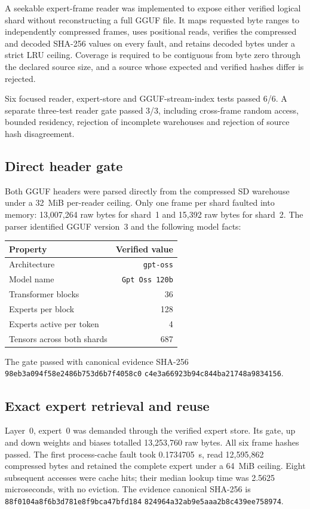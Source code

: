 A seekable expert-frame reader was implemented to expose either verified
logical shard without reconstructing a full GGUF file.  It maps requested byte
ranges to independently compressed frames, uses positional reads, verifies the
compressed and decoded SHA-256 values on every fault, and retains decoded bytes
under a strict LRU ceiling.  Coverage is required to be contiguous from byte
zero through the declared source size, and a source whose expected and verified
hashes differ is rejected.

Six focused reader, expert-store and GGUF-stream-index tests passed 6/6.  A
separate three-test reader gate passed 3/3, including cross-frame random access,
bounded residency, rejection of incomplete warehouses and rejection of source
hash disagreement.

\subsection{Direct header gate}

Both GGUF headers were parsed directly from the compressed SD warehouse under
a 32~MiB per-reader ceiling.  Only one frame per shard faulted into memory:
13,007,264 raw bytes for shard~1 and 15,392 raw bytes for shard~2.  The parser
identified GGUF version~3 and the following model facts:
\begin{center}
\begin{tabular}{lr}
\toprule
Property & Verified value \\
\midrule
Architecture & \texttt{gpt-oss} \\
Model name & \texttt{Gpt Oss 120b} \\
Transformer blocks & 36 \\
Experts per block & 128 \\
Experts active per token & 4 \\
Tensors across both shards & 687 \\
\bottomrule
\end{tabular}
\end{center}
The gate passed with canonical evidence SHA-256
\texttt{98eb3a094f58e2486b753d6b7f4058c0}%
\allowbreak\texttt{c4e3a66923b94c844ba21748a9834156}.

\subsection{Exact expert retrieval and reuse}

Layer~0, expert~0 was demanded through the verified expert store.  Its gate,
up and down weights and biases totalled 13,253,760 raw bytes.  All six frame
hashes passed.  The first process-cache fault took 0.1734705~s, read
12,595,862 compressed bytes and retained the complete expert under a 64~MiB
ceiling.  Eight subsequent accesses were cache hits; their median lookup time
was 2.5625 microseconds, with no eviction.  The evidence canonical SHA-256 is
\texttt{88f0104a8f6b3d781e8f9bca47bfd184}%
\allowbreak\texttt{824964a32ab9e5aaa2b8c439ee758974}.

